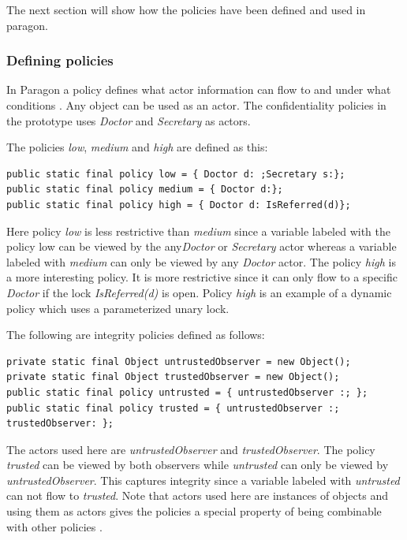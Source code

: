 The next section will show how the policies have been defined and used in paragon. 





\subsubsection{Defining policies}\label{policydef}
In Paragon a policy defines what actor information can flow to and under what conditions 
\cite{paragonprogramming}. Any object can be used as an actor. The confidentiality policies in the prototype uses \emph{Doctor} and \emph{Secretary} as actors. 

The policies \emph{low}, \emph{medium} and \emph{high} are defined as this:

\begin{lstlisting}
public static final policy low = { Doctor d: ;Secretary s:};
public static final policy medium = { Doctor d:};
public static final policy high = { Doctor d: IsReferred(d)};
\end{lstlisting}


Here policy \emph{low} is less restrictive than \emph{medium} since a variable labeled with the policy low can be viewed by the any\emph{Doctor} or \emph{Secretary} actor whereas a variable labeled with \emph{medium} can only be viewed by any \emph{Doctor} actor. The policy \emph{high} is a more interesting policy. It is more restrictive since it can only flow to a specific \emph{Doctor} if the lock \emph{IsReferred(d)} is open. Policy \emph{high} is an example of a dynamic policy which uses a parameterized unary lock.

The following are integrity policies defined as follows:
\begin{lstlisting}
private static final Object untrustedObserver = new Object();
private static final Object trustedObserver = new Object();
public static final policy untrusted = { untrustedObserver :; };
public static final policy trusted = { untrustedObserver :; trustedObserver: };
\end{lstlisting}


The actors used here are \emph{untrustedObserver} and \emph{trustedObserver}. The policy \emph{trusted} can be viewed by both observers while \emph{untrusted} can only be viewed by \emph{untrustedObserver}. This captures integrity since a variable labeled with \emph{untrusted} can not flow to \emph{trusted}. Note that actors used here are instances of objects and using them as actors gives the policies a special property of being combinable with other policies \cite{paragonprogramming}.


